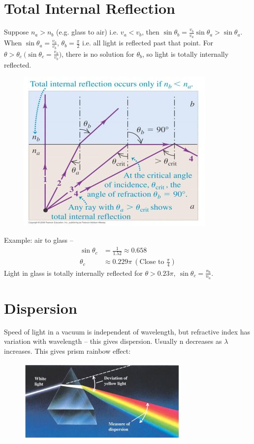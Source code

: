 \documentclass[a4paper, 11pt, normalem]{report}
\begin{document}
\section{Total Internal Reflection}
Suppose $n_{a} > n_{b}$ (e.g. glass to air) i.e. $v_{a} < v_{b}$, then $\sin{\theta_{b}} = \frac{v_{b}}{v_{a}}\sin{\theta_{a}} > \sin{\theta_{a}}$.
When $\sin{\theta_{a}} = \frac{v_{a}}{v_{b}}$, $\theta_{b} = \frac{\pi}{2}$ i.e. all light is reflected past that point.
For $\theta > \theta_{c} ~\big(\sin{\theta_{c}} = \frac{v_{a}}{v_{b}}\big)$, there is no solution for $\theta_{b}$, so light is totally internally reflected.
\begin{figure}[H]
    \centering
    \includegraphics[scale=0.8]{TIR.jpg}
\end{figure}
Example: air to glass --
\begin{align}
    \sin{\theta_{c}} &= \frac{1}{1.52} \approx 0.658 \\
    \theta_{c} &\approx 0.229\pi~(\text{Close to }\frac{\pi}{4})
\end{align}
Light in glass is totally internally reflected for $\theta > 0.23\pi,~\sin{\theta_{c}} = \frac{n_{b}}{n_{a}}$.

\section{Dispersion}
Speed of light in a vacuum is independent of wavelength, but refractive index has variation with wavelength -- this gives dispersion.
Usually n decreases as $\lambda$ increases.
This gives prism rainbow effect:
\begin{figure}[H]
    \centering
    \includegraphics[scale=0.8]{PF.jpg}
\end{figure}
\end{document}
